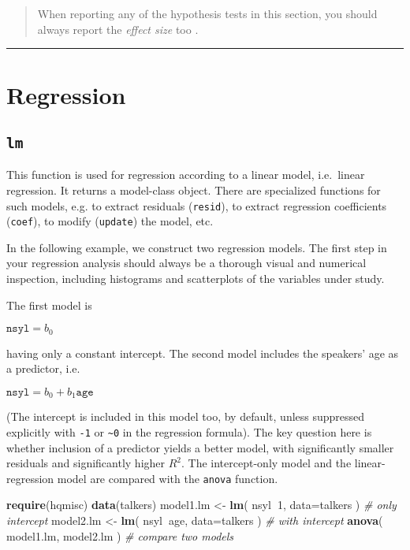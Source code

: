 \documentclass[]{book}
\newenvironment{Shaded}{\begin{snugshade}}{\end{snugshade}}
\newcommand{\CommentTok}[1]{\textcolor[rgb]{0.56,0.35,0.01}{\textit{#1}}}
\newcommand{\DataTypeTok}[1]{\textcolor[rgb]{0.13,0.29,0.53}{#1}}
\newcommand{\DecValTok}[1]{\textcolor[rgb]{0.00,0.00,0.81}{#1}}
\newcommand{\KeywordTok}[1]{\textcolor[rgb]{0.13,0.29,0.53}{\textbf{#1}}}
\newcommand{\NormalTok}[1]{#1}
\newcommand{\OperatorTok}[1]{\textcolor[rgb]{0.81,0.36,0.00}{\textbf{#1}}}
\newcommand{\StringTok}[1]{\textcolor[rgb]{0.31,0.60,0.02}{#1}}
\begin{document}
\begin{quote}
When reporting any of the hypothesis tests in this section, you should always report the \emph{effect size} too \citep{quene10}.
\end{quote}

\begin{center}\rule{0.5\linewidth}{0.5pt}\end{center}

\hypertarget{ch:regression}{%
\chapter{Regression}\label{ch:regression}}

\hypertarget{lm}{%
\section{\texorpdfstring{\texttt{lm}}{lm}}\label{lm}}

This function is used for regression according to a linear model,
i.e.~linear regression. It returns a model-class object. There are
specialized functions for such models, e.g.
to extract residuals (\texttt{resid}),
to extract regression coefficients (\texttt{coef}),
to modify (\texttt{update}) the model, etc.

In the following example, we construct two regression models.
The first step in your regression analysis should always be a thorough visual and numerical inspection, including histograms and scatterplots of the variables under
study.

The first model is

\(\texttt{nsyl} = b_0\)

having only a
constant intercept. The second model includes the speakers' age as a
predictor, i.e.

\(\texttt{nsyl} = b_0 + b_1 \texttt{age}\)

(The intercept is included in this model too, by default, unless
suppressed explicitly with \texttt{-1} or
\texttt{\textasciitilde{}0} in the regression formula). The key
question here is whether inclusion of a predictor yields a better
model, with significantly smaller residuals and significantly higher
\(R^2\). The intercept-only model and the linear-regression model are
compared with the \texttt{anova} function.

\begin{Shaded}
\begin{Highlighting}[]
\KeywordTok{require}\NormalTok{(hqmisc)}
\KeywordTok{data}\NormalTok{(talkers)}
\NormalTok{model1.lm <-}\StringTok{ }\KeywordTok{lm}\NormalTok{( nsyl}\OperatorTok{~}\DecValTok{1}\NormalTok{, }\DataTypeTok{data=}\NormalTok{talkers ) }\CommentTok{# only intercept}
\NormalTok{model2.lm <-}\StringTok{ }\KeywordTok{lm}\NormalTok{( nsyl}\OperatorTok{~}\NormalTok{age, }\DataTypeTok{data=}\NormalTok{talkers ) }\CommentTok{# with intercept}
\KeywordTok{anova}\NormalTok{( model1.lm, model2.lm ) }\CommentTok{# compare two models}
\end{Highlighting}
\end{Shaded}
\end{document}
